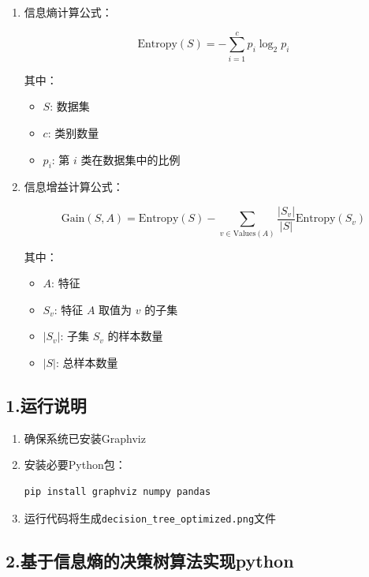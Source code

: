 \begin{enumerate}
\item 信息熵计算公式：

     \[
\text{Entropy}(S) = -\sum_{i=1}^{c} p_i \log_2 p_i
\]

其中：
\begin{itemize}
  \item $S$: 数据集
  \item $c$: 类别数量
  \item $p_i$: 第 $i$ 类在数据集中的比例
\end{itemize}   


\item 信息增益计算公式：

	\[
\text{Gain}(S, A) = \text{Entropy}(S) - \sum_{v \in \text{Values}(A)} \frac{|S_v|}{|S|} \text{Entropy}(S_v)
\]

其中：
\begin{itemize}
  \item $A$: 特征
  \item $S_v$: 特征 $A$ 取值为 $v$ 的子集
  \item $|S_v|$: 子集 $S_v$ 的样本数量
  \item $|S|$: 总样本数量
\end{itemize}

\end{enumerate}



\subsection*{1.运行说明}

\begin{enumerate}
    \item 确保系统已安装Graphviz
    \item 安装必要Python包：
    \begin{verbatim}
pip install graphviz numpy pandas
    \end{verbatim}
    \item 运行代码将生成\texttt{decision\_tree\_optimized.png}文件
\end{enumerate}

\subsection*{2.基于信息熵的决策树算法实现python}

\makeatletter
\renewcommand{\verbatim@font}{\footnotesize}
\makeatother

